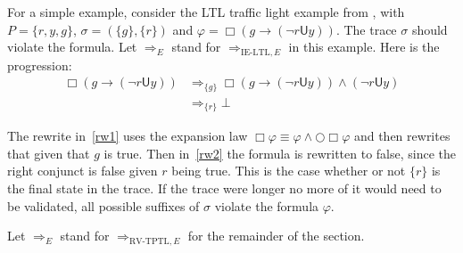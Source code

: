 \documentclass[a4paper]{article}
\newcommand{\U}{\mathsf{U}}
\newcommand{\rw}[1]{\Rightarrow_{#1}}
\begin{document}
\begin{eg}

  For a simple example, consider the LTL traffic light example from \textcite[175]{rosu2005rewriting}, with $P=\{r,y,g\}$, $\sigma = (\{g\},\{r\})$ and $\varphi = \Box (g \to (\neg r \U y))$. The trace $\sigma$ should violate the formula. Let $\rw{E}$ stand for $\rw{\text{IE-LTL},E}$ in this example. Here is the progression:
\begin{align}
  \Box (g \to (\neg r \U y)) &\rw{\{g\}} \Box (g \to (\neg r \U y)) \land (\neg r \U y)\label{rw1}\\
  &\rw{\{r\}} \bot\label{rw2}
\end{align}

The rewrite in~\eqref{rw1} uses the expansion law $\Box \varphi \equiv \varphi \land \bigcirc \Box \varphi$ and then rewrites that given that $g$ is true.
Then in~\eqref{rw2} the formula is rewritten to false, since the right conjunct is false given $r$ being true. This is the case whether or not $\{r\}$ is the final state in the trace. If the trace were longer no more of it would need to be validated, all possible suffixes of $\sigma$ violate the formula $\varphi$.
\end{eg}

Let $\rw{E}$ stand for $\rw{\text{RV-TPTL},E}$ for the remainder of the section.
\end{document}

